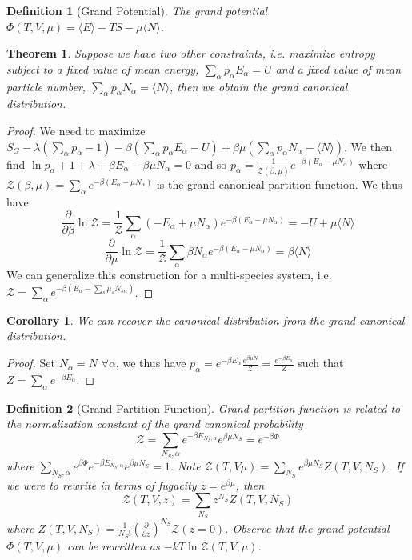 \documentclass[a4paper]{article}
\newtheorem{defi}{Definition}[section]
\newtheorem{thm}{Theorem}[section]
\newtheorem{cor}{Corollary}[section]
\theoremstyle{new}
\begin{document}
\begin{defi}[Grand Potential]
The grand potential $\Phi(T,V,\mu)=\langle E\rangle-TS-\mu\langle N\rangle$.
\end{defi}
\begin{thm}
Suppose we have two other constraints, i.e. maximize entropy subject to a fixed value of mean energy, $\sum_\alpha p_\alpha E_\alpha=U$ and a fixed value of mean particle number, $\sum_\alpha p_\alpha N_\alpha=\langle N\rangle$, then we obtain the grand canonical distribution.
\end{thm}
\begin{proof}
We need to maximize $S_G-\lambda(\sum_\alpha p_\alpha-1)-\beta(\sum_\alpha p_\alpha E_\alpha-U)+\beta\mu(\sum_\alpha p_\alpha N_\alpha-\langle N\rangle)$. We then find $\ln p_\alpha+1+\lambda+\beta E_\alpha-\beta\mu N_\alpha=0$ and so $p_\alpha=\frac{1}{\mathcal{Z}(\beta,\mu)}e^{-\beta(E_\alpha-\mu N_\alpha)}$ where $\mathcal{Z}(\beta,\mu)=\sum_\alpha e^{-\beta(E_\alpha-\mu N_\alpha)}$ is the grand canonical partition function. We thus have
$$\frac{\partial}{\partial\beta}\ln\mathcal{Z}=\frac{1}{\mathcal{Z}}\sum_\alpha(-E_\alpha+\mu N_\alpha)e^{-\beta(E_\alpha-\mu N_\alpha)}=-U+\mu\langle N\rangle$$
$$\frac{\partial}{\partial\mu}\ln\mathcal{Z}=\frac{1}{\mathcal{Z}}\sum_\alpha\beta N_\alpha e^{-\beta(E_\alpha-\mu N_\alpha)}=\beta\langle N\rangle$$
We can generalize this construction for a multi-species system, i.e. $\mathcal{Z}=\sum_\alpha e^{-\beta(E_\alpha-\sum_s\mu_sN_{s\alpha})}$.
\end{proof}
\begin{cor}
We can recover the canonical distribution from the grand canonical distribution.
\end{cor}
\begin{proof}
Set $N_\alpha=N$ $\forall\alpha$, we thus have $p_\alpha=e^{-\beta E_\alpha}\frac{e^{\beta\mu N}}{\mathcal{Z}}=\frac{e^{-\beta E_\alpha}}{Z}$ such that $Z=\sum_\alpha e^{-\beta E_\alpha}$.
\end{proof}
\begin{defi}[Grand Partition Function]
Grand partition function is related to the normalization constant of the grand canonical probability
$$\mathcal{Z}=\sum_{N_S,\alpha}e^{-\beta E_{N_S,\alpha}}e^{\beta\mu N_S}=e^{-\beta\Phi}$$
where $\sum_{N_S,\alpha}e^{\beta\Phi}e^{-\beta E_{N_S,\alpha}}e^{\beta\mu N_S}=1$. Note $\mathcal{Z}(T,V\mu)=\sum_{N_S}e^{\beta\mu N_S}Z(T,V,N_S)$. If we were to rewrite in terms of fugacity $z=e^{\beta\mu}$, then
$$\mathcal{Z}(T,V,z)=\sum_{N_S}z^{N_S}Z(T,V,N_S)$$
where $Z(T,V,N_S)=\frac{1}{N_S!}(\frac{\partial}{\partial z})^{N_S}\mathcal{Z}(z=0)$. Observe that the grand potential $\Phi(T,V,\mu)$ can be rewritten as $-kT\ln\mathcal{Z}(T,V,\mu)$.
\end{defi}
\end{document}
